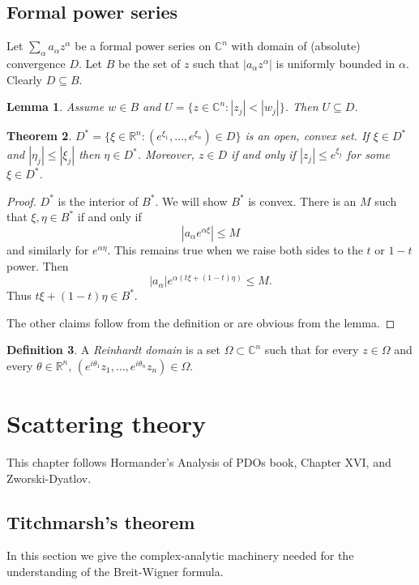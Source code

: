 \documentclass[12pt]{report}
\newcommand{\RR}{\mathbb{R}}
\newcommand{\CC}{\mathbb{C}}
\newcommand{\dfn}[1]{\emph{#1}\index{#1}}
\newtheorem{theorem}{Theorem}[chapter]
\newtheorem{lemma}[theorem]{Lemma}
\theoremstyle{definition}
\newtheorem{definition}[theorem]{Definition}
\begin{document}
\section{Formal power series}
Let $\sum_\alpha a_\alpha z^\alpha$ be a formal power series on $\CC^n$ with domain of (absolute) convergence $D$. Let $B$ be the set of $z$ such that $|a_\alpha z^\alpha|$ is uniformly bounded in $\alpha$. Clearly $D \subseteq B$.
\begin{lemma}
    Assume $w \in B$ and $U = \{z \in \CC^n: |z_j| < |w_j|\}$. Then $U \subseteq D$. 
\end{lemma}
\begin{theorem}
    $D^* = \{\xi \in \RR^n: (e^{\xi_1}, \dots, e^{\xi_n}) \in D\}$ is an open, convex set. If $\xi \in D^*$ and $|\eta_j| \leq |\xi_j|$ then $\eta \in D^*$. Moreover, $z \in D$ if and only if $|z_j| \leq e^{\xi_j}$ for some $\xi \in D^*$.
\end{theorem}
\begin{proof}
    $D^*$ is the interior of $B^*$. We will show $B^*$ is convex. There is an $M$ such that $\xi, \eta \in B^*$ if and only if
    $$|a_\alpha e^{\alpha\xi}| \leq M$$
    and similarly for $e^{\alpha\eta}$. This remains true when we raise both sides to the $t$ or $1-t$ power. Then
    $$|a_\alpha|e^{\alpha(t\xi + (1-t)\eta)} \leq M.$$
    Thus $t\xi + (1-t)\eta \in B^*$.

    The other claims follow from the definition or are obvious from the lemma.
\end{proof}
\begin{definition}
    A \dfn{Reinhardt domain} is a set $\Omega \subset \CC^n$ such that for every $z \in \Omega$ and every $\theta \in \RR^n$, $(e^{i\theta_1} z_1, \dots, e^{i\theta_n} z_n) \in \Omega$.
\end{definition}



    
    
    

\chapter{Scattering theory}
This chapter follows Hormander's Analysis of PDOs book, Chapter XVI, and Zworski-Dyatlov.

\section{Titchmarsh's theorem}
In this section we give the complex-analytic machinery needed for the understanding of the Breit-Wigner formula.
\end{document}
